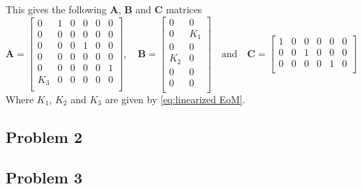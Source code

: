 This gives the following $\bm{A}$, $\bm{B}$ and $\bm{C}$ matrices
\begin{equation}
  \label{eq:state_space_A_B_C}
  \bm{A} =
  \begin{bmatrix}
    0 & 1 & 0 & 0 & 0 & 0 \\
    0 & 0 & 0 & 0 & 0 & 0 \\
    0 & 0 & 0 & 1 & 0 & 0 \\
    0 & 0 & 0 & 0 & 0 & 0 \\
    0 & 0 & 0 & 0 & 0 & 1 \\
    K_3 & 0 & 0 & 0 & 0 & 0 \\
  \end{bmatrix}
  , \quad \bm{B} =
  \begin{bmatrix}
    0 & 0 \\
    0 & K_1 \\
    0 & 0 \\
    K_2 & 0 \\
    0 & 0 \\
    0 & 0 \\
  \end{bmatrix}
  \quad \text{and} \quad \bm{C} =
  \begin{bmatrix}
    1 & 0 & 0 & 0 & 0 & 0 \\
    0 & 0 & 1 & 0 & 0 & 0 \\
    0 & 0 & 0 & 0 & 1 & 0 \\
  \end{bmatrix}
\end{equation}
Where $K_1$, $K_2$ and $K_3$ are given by \cref{eq:linearized EoM}.
\subsection{Problem 2}

\subsection{Problem 3}
